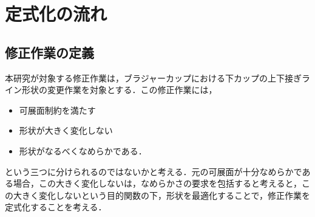 \newcommand{\STP}[3]{\det[#1,\; #2,\; #3]}

\section{定式化の流れ}
	\subsection{修正作業の定義}
		
		本研究が対象する修正作業は，ブラジャーカップにおける下カップの上下接ぎライン形状の変更作業を対象とする．この修正作業には，
		\begin{itemize}
			\item 可展面制約を満たす
			\item 形状が大きく変化しない
			\item 形状がなるべくなめらかである．
		\end{itemize}
		という三つに分けられるのではないかと考える．元の可展面が十分なめらかである場合，この大きく変化しないは，なめらかさの要求を包括すると考えると，この大きく変化しないという目的関数の下，形状を最適化することで，修正作業を定式化することを考える．
		
	